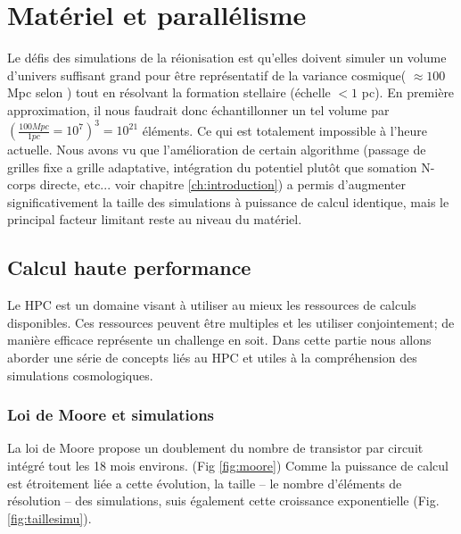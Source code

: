
\chapter{Matériel et parallélisme}
\label{sec:materiel}

Le défis des simulations de la réionisation est qu'elles doivent simuler un volume d'univers suffisant grand pour être représentatif de la variance cosmique( $\approx 100$ Mpc selon \cite{iliev_cosmological_2006}) tout en résolvant la formation stellaire (échelle $<1$ pc).
En première approximation, il nous faudrait donc échantillonner un tel volume par $\left( \frac{100Mpc}{1pc} = 10^7 \right) ^3 = 10^{21}$ éléments.
Ce qui est totalement impossible à l'heure actuelle.
Nous avons vu que l'amélioration de certain algorithme (passage de grilles fixe a grille adaptative, intégration du potentiel plutôt que somation N-corps directe, etc... voir chapitre \ref{ch:introduction}) a permis d'augmenter significativement la taille des simulations à puissance de calcul identique, mais le principal facteur limitant reste au niveau du matériel.

\section{Calcul haute performance}

Le \ac{HPC} est un domaine visant à utiliser au mieux les ressources de calculs disponibles.
Ces ressources peuvent être multiples et les utiliser conjointement; de manière efficace représente un challenge en soit.
Dans cette partie nous allons aborder une série de concepts liés au \ac{HPC} et utiles à la compréhension des simulations cosmologiques.


\subsection{Loi de Moore et simulations}
La loi de Moore \citep{moore1965cramming} propose un doublement du nombre de transistor par circuit intégré tout les 18 mois environs. (Fig \ref{fig:moore})
Comme la puissance de calcul est étroitement liée a cette évolution, la taille -- le nombre d'éléments de résolution -- des simulations, suis également cette croissance exponentielle (Fig. \ref{fig:taillesimu}).

